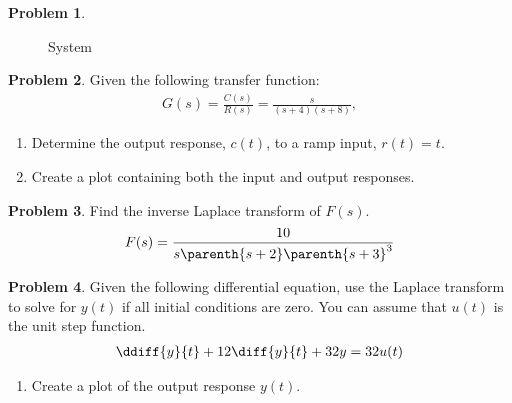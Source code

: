 \documentclass[10pt]{article}
\theoremstyle{definition}
\newtheorem{prob}{Problem}[section]
\newenvironment{subprob}%
{\renewcommand{\theenumi}{\alph{enumi}}\renewcommand{\labelenumi}{(\theenumi)}\begin{enumerate}}%
{\end{enumerate}}%
\begin{document}
\begin{prob}
\begin{subprob}
\begin{figure}[h]
\begin{scaletikzpicturetowidth}{2\textwidth}
            \end{scaletikzpicturetowidth}
            \caption{System~\label{fig:bd2}}
        \end{figure}
    \end{subprob}
\end{prob}

\begin{prob}
    Given the following transfer function:
    \begin{align*}
        G(s) = \frac{C(s)}{R(s)} = \frac{s}{(s +4)(s+8)} ,
    \end{align*}
    \begin{subprob}
        \item Determine the output response, \( c(t) \), to a ramp input, \( r(t) = t \).
        \item Create a plot containing both the input and output responses.
    \end{subprob}
\end{prob}

\begin{prob}
    Find the inverse Laplace transform of \( F(s)\).
    \begin{align*}
        F(s) = \frac{10}{s \parenth{s+2}\parenth{s+3}^3}
    \end{align*}
\end{prob}



\begin{prob}
    Given the following differential equation, use the Laplace transform to solve for \( y(t) \) if all initial conditions are zero. 
    You can assume that \(u(t) \) is the unit step function.
    \begin{align*}
        \ddiff{y}{t} + 12 \diff{y}{t} + 32 y = 32 u(t)
    \end{align*}

    \begin{subprob}
    \item Create a plot of the output response \( y(t) \).
    \end{subprob}
\end{prob}
\end{document}
